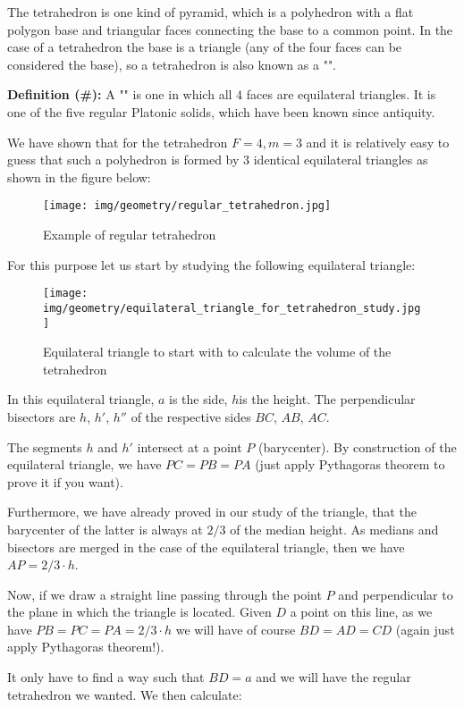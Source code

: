 {	The tetrahedron is one kind of pyramid, which is a polyhedron with a flat polygon base and triangular faces connecting the base to a common point. In the case of a tetrahedron the base is a triangle (any of the four faces can be considered the base), so a tetrahedron is also known as a "".
	
	\textbf{Definition (\#\mydef):} A "" is one in which all $4$ faces are equilateral triangles. It is one of the five regular Platonic solids, which have been known since antiquity.
	
	We have shown that for the tetrahedron $F=4,m=3$ and it is relatively easy to guess that such a polyhedron is formed by $3$ identical equilateral triangles as shown in the figure below:
	\begin{figure}[H]
		\centering
		\texttt{[image: img/geometry/regular\_tetrahedron.jpg]}
		\caption{Example of regular tetrahedron}
	\end{figure}
	For this purpose let us start by studying the following equilateral triangle:
	\begin{figure}[H]
		\centering
		\texttt{[image: img/geometry/equilateral\_triangle\_for\_tetrahedron\_study.jpg]}
		\caption[]{Equilateral triangle to start with to calculate the volume of the tetrahedron}
	\end{figure}
	In this equilateral triangle, $a$ is the side, $h$is the height. The perpendicular bisectors are $h$, $h'$, $h''$ of the respective sides $BC$, $AB$, $AC$.

	The segments $h$ and $h'$ intersect at a point $P$ (barycenter). By construction of the equilateral triangle, we have $PC=PB=PA$ (just apply Pythagoras theorem to prove it if you want).
	
	Furthermore, we have already proved in our study of the triangle, that the barycenter of the latter is always at $2/3$ of the median height. As medians and bisectors are merged in the case of the equilateral triangle, then we have $AP=2/3 \cdot h$.
	
	Now, if we draw a straight line passing through the point $P$ and perpendicular to the plane in which the triangle is located. Given $D$ a point on this line, as we have $PB=PC=PA=2/3\cdot h$ we will have of course $BD=AD=CD$ (again just apply Pythagoras theorem!).
	
	It only have to find a way such that $BD=a$ and we will have the regular tetrahedron we wanted. We then calculate:
	
}
